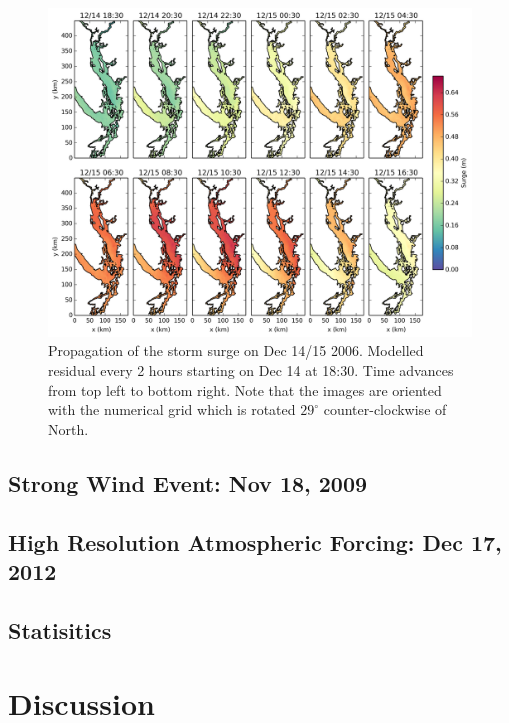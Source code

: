 \documentclass[pdftex,10pt]{article}
\begin{document}
\begin{figure}
\centering
\includegraphics[scale=0.6]{Figures/dec2006_spatial.pdf}
\caption{Propagation of the storm surge on Dec 14/15 2006. Modelled residual every 2 hours starting on Dec 14 at 18:30. Time advances from top left to bottom right. Note that the images are oriented with the numerical grid which is rotated $29^{\circ}$ counter-clockwise of North. }
\label{fig:spatial}
\end{figure}

\subsection{Strong Wind Event: Nov 18, 2009}

\subsection{High Resolution Atmospheric Forcing: Dec 17, 2012}

\subsection{Statisitics}

\section{Discussion}\label{sec:diss}
\end{document}
